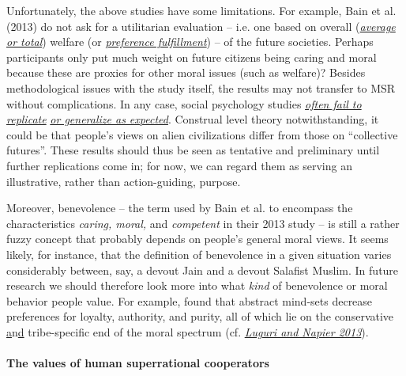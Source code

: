 Unfortunately, the above studies have some limitations. For example,
Bain et al. (2013) do not ask for a utilitarian evaluation -- i.e. one
based on overall
(\href{https://en.wikipedia.org/wiki/Average_and_total_utilitarianism}{\emph{average
or total}}) welfare (or
\href{https://en.wikipedia.org/wiki/Preference_utilitarianism}{\emph{preference
fulfillment}}) -- of the future societies. Perhaps participants only put
much weight on future citizens being caring and moral because these are
proxies for other moral issues (such as welfare)? Besides methodological
issues with the study itself, the results may not transfer to MSR
without complications. In any case, social psychology studies
\href{https://en.wikipedia.org/wiki/Replication_crisis}{\emph{often fail
to replicate}}
\href{http://www.openphilanthropy.org/2017-report-consciousness-and-moral-patienthood\#AppendixZ8}{\emph{or
generalize as expected}}. Construal level theory notwithstanding, it
could be that people's views on alien civilizations differ from those on
``collective futures''. These results should thus be seen as tentative
and preliminary until further replications come in; for now, we can
regard them as serving an illustrative, rather than action-guiding,
purpose.

Moreover, benevolence -- the term used by Bain et al. to encompass the
characteristics \emph{caring, moral,} and \emph{competent} in their 2013
study -- is still a rather fuzzy concept that probably depends on
people's general moral views. It seems likely, for instance, that the
definition of benevolence in a given situation varies considerably
between, say, a devout Jain and a devout Salafist Muslim. In future
research we should therefore look more into what \emph{kind} of
benevolence or moral behavior people value. For example,
\parencite{Napier2013-mp} found that abstract mind-sets
decrease preferences for loyalty, authority, and purity, all of which
lie on the conservative
\href{https://en.wikipedia.org/wiki/Moral_foundations_theory\#Political_ideology}{a}n\href{https://en.wikipedia.org/wiki/Moral_foundations_theory\#Political_ideology}{d}
tribe-specific end of the moral spectrum (cf.
\href{https://www.researchgate.net/profile/Jaime_Napier/publication/277451893_Of_two_minds_The_interactive_effect_of_construal_level_and_identity_on_political_polarization/links/56d7f5ec08aebe4638af2566.pdf}{\emph{Luguri
and Napier 2013}}).

\paragraph{The values of human superrational
cooperators}\label{the-values-of-human-superrational-cooperators}

